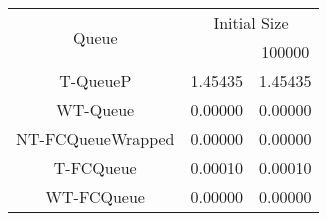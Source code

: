 \begin{tabular}{|c|c|c|}
\hline
\multirow{2}{*}{Queue} & \multicolumn{2}{c|}{Initial Size}\\\cline{2-3}& \qquad 10000 \qquad\quad & 100000\\
\hline
\hline
T-QueueP & 1.45435 & 1.45435\\
WT-Queue & 0.00000 & 0.00000\\
NT-FCQueueWrapped & 0.00000 & 0.00000\\
T-FCQueue & 0.00010 & 0.00010\\
WT-FCQueue & 0.00000 & 0.00000\\
\hline\end{tabular}
